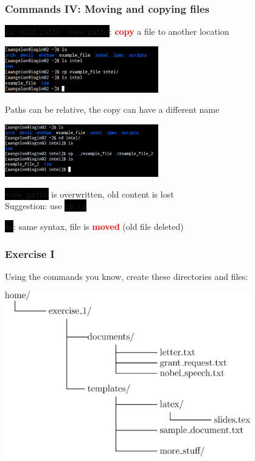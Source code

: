 \documentclass[unknownkeysallowed, 10pt, a4 paper, handout]{beamer}
\newcommand{\focus}[1]{\textbf{\textcolor{red}{#1}}}
\newcommand{\code}[1]{\colorbox{black}{\color{green}\texttt{#1}}}
\begin{document}
\begin{frame}[c]
  \begin{center}
    \frametitle{Commands IV: Moving and copying files}

    \code{cp <old\_path> <new\_path>}: \focus{copy} a file to another location
    \vspace{-3mm}

    \begin{center}
      \includegraphics[width=0.50\textwidth]{pics/cp_1.png}
    \end{center}

    Paths can be relative, the copy can have a different name\\
    \vspace{-1mm}

    \begin{center}
      \includegraphics[width=0.50\textwidth]{pics/cp_2.png}
    \end{center}

    \code{<new\_path>} is overwritten, old content is lost\\
    Suggestion: use \code{cp -i}

    \code{mv}: same syntax, file is \focus{moved} (old file deleted)
  \end{center}
\end{frame}


\begin{frame}[c]
  \begin{center}
    \frametitle{Exercise I}
    Using the commands you know, create these directories and files:

    \begin{center}
      \includegraphics[width=0.80\textwidth]{pics/exercise_1.eps}
    \end{center}
  \end{center}
\end{frame}
\end{document}
